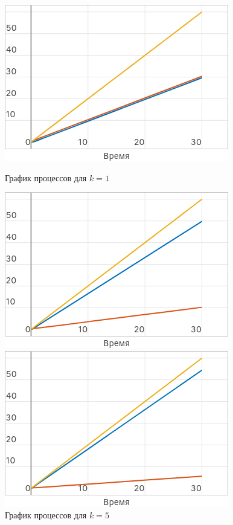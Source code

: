 \documentclass[a4paper]{article}
\begin{document}
\begin{figure}[H]
    \centering
    \begin{minipage}{0.32\textwidth}
        \includegraphics[width=\textwidth]{sources/task1_Vt_k=1.png}
        \caption*{График процессов для $k = 1$}
    \end{minipage}
    \hfill
    \begin{minipage}{0.32\textwidth}
        \includegraphics[width=\textwidth]{sources/task1_Vt_k=5.png}
        \caption*{График процессов для $k = 5$}
    \end{minipage}
    \hfill
    \begin{minipage}{0.32\textwidth}
        \includegraphics[width=\textwidth]{sources/task1_Vt_k=10.png}

\end{minipage}
\end{figure}
\end{document}

